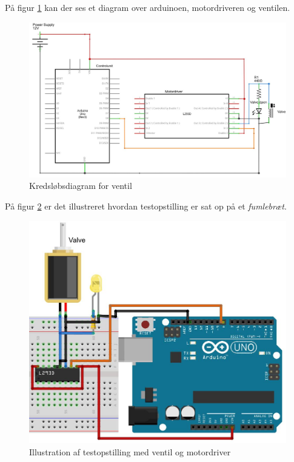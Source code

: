  På figur \ref{fig:ventildiagram} kan der ses et diagram over arduinoen, motordriveren og ventilen.

\begin{figure}[H]
	\centering
	\includegraphics[width=1\textwidth]{billeder/Hardware/diagrammer/ventildiagram.JPG}
	\caption{Kredsløbsdiagram for ventil}
	\label{fig:ventildiagram}
\end{figure} 

På figur \ref{fig:ventilbreadboard} er det illustreret hvordan testopstilling er sat op på et \textit{fumlebræt}.

\begin{figure}[H]
	\centering
	\includegraphics[width=1\textwidth]{billeder/Hardware/diagrammer/Ventilbreadboard.JPG}
	\caption{Illustration af testopstilling med ventil og motordriver}
	\label{fig:ventilbreadboard}
\end{figure} 
 
